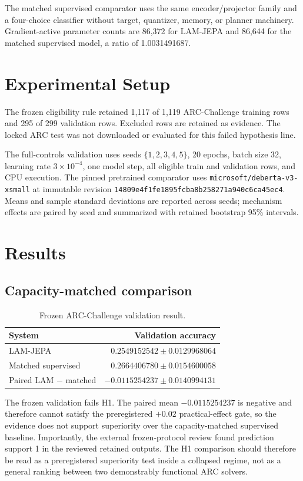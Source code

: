 \documentclass[11pt]{article}
\begin{document}
The matched supervised comparator uses the same encoder/projector family and a four-choice classifier without target, quantizer, memory, or planner machinery. Gradient-active parameter counts are 86,372 for LAM-JEPA and 86,644 for the matched supervised model, a ratio of 1.0031491687.

\section{Experimental Setup}
The frozen eligibility rule retained 1,117 of 1,119 ARC-Challenge training rows and 295 of 299 validation rows. Excluded rows are retained as evidence. The locked ARC test was not downloaded or evaluated for this failed hypothesis line.

The full-controls validation uses seeds $\{1,2,3,4,5\}$, 20 epochs, batch size 32, learning rate $3\times10^{-4}$, one model step, all eligible train and validation rows, and CPU execution. The pinned pretrained comparator uses \texttt{microsoft/deberta-v3-xsmall} at immutable revision \texttt{14809e4f1fe1895fcba8b258271a940c6ca45ec4}. Means and sample standard deviations are reported across seeds; mechanism effects are paired by seed and summarized with retained bootstrap 95\% intervals.

\section{Results}
\subsection{Capacity-matched comparison}
\begin{table}[h]
\centering
\caption{Frozen ARC-Challenge validation result.}
\begin{tabular}{lr}
\toprule
System & Validation accuracy \\
\midrule
LAM-JEPA & $0.2549152542 \pm 0.0129968064$ \\
Matched supervised & $0.2664406780 \pm 0.0154600058$ \\
Paired LAM $-$ matched & $-0.0115254237 \pm 0.0140994131$ \\
\bottomrule
\end{tabular}
\end{table}
The frozen validation fails H1. The paired mean $-0.0115254237$ is negative and therefore cannot satisfy the preregistered $+0.02$ practical-effect gate, so the evidence does not support superiority over the capacity-matched supervised baseline. Importantly, the external frozen-protocol review found prediction support 1 in the reviewed retained outputs. The H1 comparison should therefore be read as a preregistered superiority test inside a collapsed regime, not as a general ranking between two demonstrably functional ARC solvers.
\end{document}
